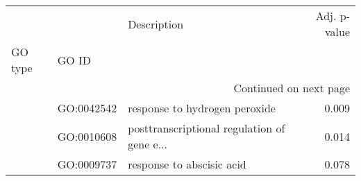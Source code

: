 \begin{longtable}{lllr}
\toprule
   &            &                                  Description &  Adj. p-value \\
GO type & GO ID &                                              &               \\
\midrule
\endhead
\midrule
\multicolumn{4}{r}{{Continued on next page}} \\
\midrule
\endfoot

\bottomrule
\endlastfoot
\multirow{3}{*}{BP} & GO:0042542 &                response to hydrogen peroxide &         0.009 \\
   & GO:0010608 &  posttranscriptional regulation of gene e... &         0.014 \\
   & GO:0009737 &                    response to abscisic acid &         0.078 \\
\end{longtable}
